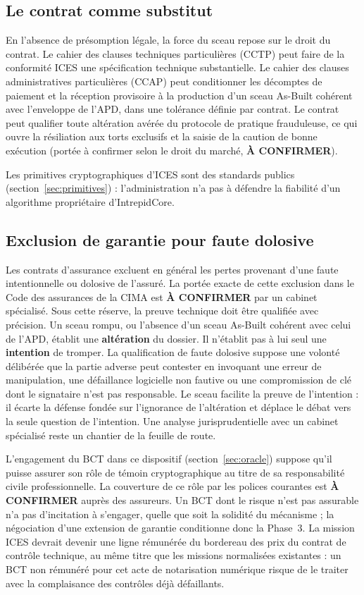 \documentclass[11pt,a4paper]{article}
\newcommand{\aconfirmer}{\textbf{\color{rouge}À CONFIRMER}}
\begin{document}
\subsection{Le contrat comme substitut}

En l'absence de présomption légale, la force du sceau repose sur le droit du contrat. Le cahier des clauses techniques particulières (CCTP) peut faire de la conformité ICES une spécification technique substantielle. Le cahier des clauses administratives particulières (CCAP) peut conditionner les décomptes de paiement et la réception provisoire à la production d'un sceau As-Built cohérent avec l'enveloppe de l'APD, dans une tolérance définie par contrat. Le contrat peut qualifier toute altération avérée du protocole de pratique frauduleuse, ce qui ouvre la résiliation aux torts exclusifs et la saisie de la caution de bonne exécution (portée à confirmer selon le droit du marché, \aconfirmer).

Les primitives cryptographiques d'ICES sont des standards publics (section~\ref{sec:primitives}) : l'administration n'a pas à défendre la fiabilité d'un algorithme propriétaire d'IntrepidCore.

\subsection{Exclusion de garantie pour faute dolosive}

Les contrats d'assurance excluent en général les pertes provenant d'une faute intentionnelle ou dolosive de l'assuré. La portée exacte de cette exclusion dans le Code des assurances de la CIMA est \aconfirmer{} par un cabinet spécialisé. Sous cette réserve, la preuve technique doit être qualifiée avec précision. Un sceau rompu, ou l'absence d'un sceau As-Built cohérent avec celui de l'APD, établit une \textbf{altération} du dossier. Il n'établit pas à lui seul une \textbf{intention} de tromper. La qualification de faute dolosive suppose une volonté délibérée que la partie adverse peut contester en invoquant une erreur de manipulation, une défaillance logicielle non fautive ou une compromission de clé dont le signataire n'est pas responsable. Le sceau facilite la preuve de l'intention : il écarte la défense fondée sur l'ignorance de l'altération et déplace le débat vers la seule question de l'intention. Une analyse jurisprudentielle avec un cabinet spécialisé reste un chantier de la feuille de route.

L'engagement du BCT dans ce dispositif (section~\ref{sec:oracle}) suppose qu'il puisse assurer son rôle de témoin cryptographique au titre de sa responsabilité civile professionnelle. La couverture de ce rôle par les polices courantes est \aconfirmer{} auprès des assureurs. Un BCT dont le risque n'est pas assurable n'a pas d'incitation à s'engager, quelle que soit la solidité du mécanisme ; la négociation d'une extension de garantie conditionne donc la Phase~3. La mission ICES devrait devenir une ligne rémunérée du bordereau des prix du contrat de contrôle technique, au même titre que les missions normalisées existantes : un BCT non rémunéré pour cet acte de notarisation numérique risque de le traiter avec la complaisance des contrôles déjà défaillants.
\end{document}
